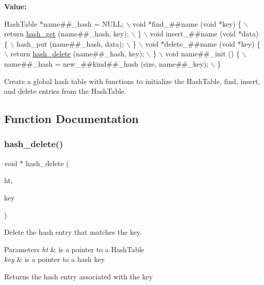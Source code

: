 {\bfseries Value\+:}
\begin{DoxyCode}
HashTable *name##\_hash = NULL;       \(\backslash\)
  void *find\_##name (\textcolor{keywordtype}{void} *key) \{      \(\backslash\)
    return \hyperlink{group__hash_ga92a539c92a9ff17735271e171b70adab}{hash\_get} (name##\_hash, key);    \(\backslash\)
  \}              \(\backslash\)
  void insert\_##name (\textcolor{keywordtype}{void} *data) \{      \(\backslash\)
    hash\_put (name##\_hash, data);      \(\backslash\)
  \}              \(\backslash\)
  void *delete\_##name (\textcolor{keywordtype}{void} *key) \{      \(\backslash\)
    return \hyperlink{group__hash_ga4bbe51c4d1aac0038cc86f9f12f877d0}{hash\_delete} (name##\_hash, key);    \(\backslash\)
  \}              \(\backslash\)
  void name##\_init () \{         \(\backslash\)
    name##\_hash = new\_##kind##\_hash (size, name##\_key); \(\backslash\)
  \}
\end{DoxyCode}


Create a global hash table with functions to initialize the Hash\+Table, find, insert, and delete entries from the Hash\+Table. 



\subsection{Function Documentation}
\mbox{\label{group__hash_ga4bbe51c4d1aac0038cc86f9f12f877d0}} 
\subsubsection{\texorpdfstring{hash\+\_\+delete()}{hash\_delete()}}
{\footnotesize\ttfamily void $\ast$ hash\+\_\+delete (\begin{DoxyParamCaption}\item[{Hash\+Table $\ast$}]{ht,  }\item[{void $\ast$}]{key }\end{DoxyParamCaption})}



Delete the hash entry that matches the key. 


\begin{DoxyParams}{Parameters}
{\em ht} & is a pointer to a Hash\+Table \\
\hline
{\em key} & is a pointer to a hash key \\
\hline
\end{DoxyParams}
\begin{DoxyReturn}{Returns}
the hash entry associated with the key 
\end{DoxyReturn}
\mbox{\label{group__hash_ga30d10595d9b6fd1f5078dc3d280f4d0f}} 
